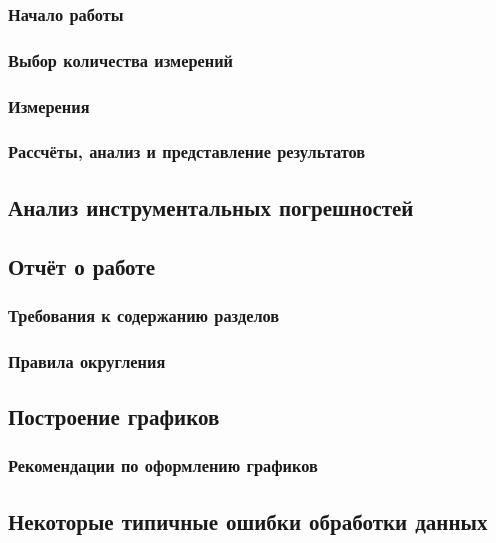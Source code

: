 \documentclass[12pt]{article}
\begin{document}
      \subsubsection{Начало работы}

      \subsubsection{Выбор количества измерений}

      \subsubsection{Измерения}

      \subsubsection{Рассчёты, анализ и представление результатов}

    \subsection{Анализ инструментальных погрешностей}

    \subsection{Отчёт о работе}

      \subsubsection{Требования к содержанию разделов}

      \subsubsection{Правила округления}

    \subsection{Построение графиков}

      \subsubsection{Рекомендации по оформлению графиков}

    \subsection{Некоторые типичные ошибки обработки данных}
\end{document}
